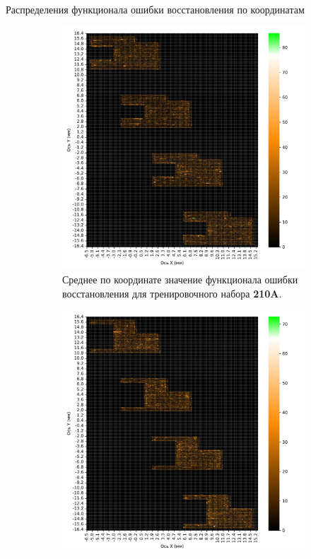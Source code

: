 \documentclass{article}
\begin{document}
\newpage

\begin{subsection}{Распределения функционала ошибки восстановления по координатам \label{app:distrs}}

    \begin{figure}[H]
        \centering
        \begin{subfigure}{.47\textwidth}
            \centering
            \includegraphics[scale=.3]{lstm_2_window_xy_train.pdf}
            \caption{Среднее по координате значение функционала ошибки восстановления для тренировочного набора \textbf{210A}.}\label{lstm_2_window_xy_train}
        \end{subfigure}
        \hfill
        \begin{subfigure}{.47\textwidth}
            \centering
            \includegraphics[scale=.3]{lstm_2_window_xy_test.pdf}

\end{subfigure}
\end{figure}
\end{subsection}
\end{document}
